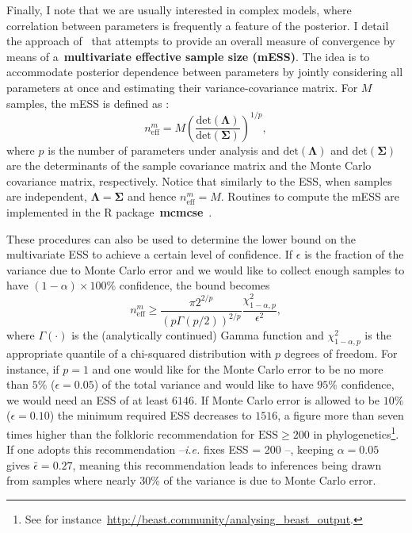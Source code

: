 Finally, I note  that we are usually interested in complex models, where correlation between parameters is frequently a feature of the posterior.
I detail the approach of~\cite{Vats2015} that attempts to provide an overall measure of convergence by means of a~\textbf{multivariate effective sample size (mESS)}.
The idea is to accommodate posterior dependence between parameters by jointly considering all parameters at once and estimating their variance-covariance matrix.
For $M$ samples, the mESS is defined as :
\begin{equation}
 \label{eq:multiESS}
 n_{\text{eff}}^m = M\left(\frac{\text{det}(\boldsymbol\Lambda)}{\text{det}(\boldsymbol\Sigma)}\right)^{1/p},
\end{equation}
where $p$ is the number of parameters under analysis and $\text{det}(\boldsymbol\Lambda)$ and $\text{det}(\boldsymbol\Sigma)$ are the determinants of the sample covariance matrix and the Monte Carlo covariance matrix, respectively.
Notice that similarly to the ESS, when samples are independent, $\boldsymbol\Lambda = \boldsymbol\Sigma$ and hence $ n_{\text{eff}}^m = M$.
Routines to compute the mESS are implemented in the R package~\textbf{mcmcse}~\citep{Flegal2017}.

These procedures can also be used to determine the lower bound on the multivariate ESS to achieve a certain level of confidence.
If $\epsilon$ is the fraction of the variance due to Monte Carlo error and we would like to collect enough samples to have $(1-\alpha)\times 100 \%$ confidence, the bound becomes
\begin{equation}
 \label{eq:mESSbound}
  n_{\text{eff}}^m  \geq \frac{\pi2^{2/p}}{(p \Gamma(p/2))^{2/p}} \frac{\chi^2_{1-\alpha, p}}{\epsilon^2},
\end{equation}
where $\Gamma(\cdot)$ is the (analytically continued) Gamma function and  $\chi^2_{1-\alpha, p}$ is the appropriate quantile of a chi-squared distribution with $p$ degrees of freedom.
For instance, if $p=1$ and one would like for the Monte Carlo error to be no more than $5\%$ ($\epsilon = 0.05$) of the total variance and would like to have $95\%$ confidence, we would need an ESS of at least $6146$.
If Monte Carlo error is allowed to be $10\%$ ($\epsilon = 0.10$) the minimum required ESS decreases to $1516$, a figure more than seven times higher than the folkloric recommendation for $\text{ESS} \geq 200$ in phylogenetics\footnote{See for instance~\url{http://beast.community/analysing_beast_output}.}.
If one adopts this recommendation --\textit{i.e.} fixes ESS = 200 --, keeping $\alpha = 0.05$ gives $\bar{\epsilon} = 0.27$, meaning this recommendation leads to inferences being drawn from samples where nearly 30\% of the variance is due to Monte Carlo error.

